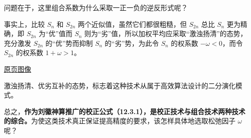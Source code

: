 \documentclass[
  10pt,
  fontset=fandol]{ctexart}
\begin{document}
问题在于，这里组合系数为什么采取一正一负的逆反形式呢？

事实上，比较 \(S_n\) 和 \(S_{2n}\) 两个近似值，虽然它们都很粗糙，但 \(S_{2n}\) 总比 \(S_n\) 更为精确，即 \(S_{2n}\) 为``优''值而 \(S_n\) 则为``劣''值，所以加权平均应采取``激浊扬清''的态势，充分激发 \(S_{2n}\) 的``优''势而抑制 \(S_n\) 的``劣''势，为此令 \(S_n\) 的权系数 \(-\omega<0\)，而令 \(S_{2n}\) 的权系数 \(1+\omega>1\)。

\href{../../source-images/pdf-299.jpeg}{原页图像}

激浊扬清、优劣互补的态势，标志着这种技术从属于高效算法设计的二分演化模式。

总之，\textbf{作为刘徽神算推广的校正公式（12.3.1），是校正技术与组合技术两种技术的综合。}为使这类技术真正保证提高精度的要求，该怎样具体地选取松弛因子 \(\omega\) 呢？
\end{document}
